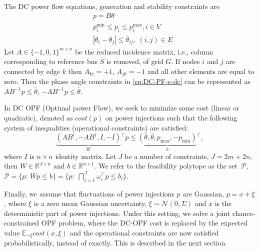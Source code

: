 The DC power flow equations, generation and stability constraints are
\begin{align}
    & p = B \theta \label{eq:DC-PF-a-dc}\\
    & p^{\min}_i \leq p_i \leq p^{\max}_i, i \in V \label{eq:DC-PF-b-dc}\\
    & |\theta_i - \theta_j| \leq \bar{\theta}_{ij}, \; (i,j)\in E \label{eq:DC-PF-c-dc}
\end{align}
Let $A \in \{-1,0,1 \}^{m \times n}$ be the reduced incidence matrix, i.e., column corresponding to reference bus $S$ is removed, of grid $G$. If nodes $i$ and $j$ are connected by edge $k$ then $A_{ki} = +1$, $A_{jk} = -1$ and all other elements are equal to zero. Then the phase angle constraints in \eqref{eq:DC-PF-c-dc} can be represented as  $AB^{-1}p \le \bar\theta$, $-AB^{-1}p \le \bar\theta$. 

In DC OPF (Optimal power Flow), we seek to minimize some cost (linear or quadratic), denoted as $\textit{cost}(p)$ on power injections such that the following system of inequalities (operational constraints) are satisfied: 
\[
\underbrace{(AB^\dagger, - A B^\dagger, I, -I)}_{W}\!\!{}^\top p \le \underbrace{(\bar\theta, \bar\theta, p_{\max}, -p_{\min})}_b\!\!{}^\top,
\]
where $I$ is $n\times n$ identity matrix. Let $J$ be a number of constraints, $J = 2m + 2n$, then $W\in\mathbb{R}^{J\times n}$ and $b\in\mathbb{R}^{n\times 1}$. We refer to the feasibility polytope as the set~$\mathcal{P}$, 
$\mathcal{P} = \bigl\{p:\, Wp \le b\bigr\} = \bigl\{p:\; \bigcap_{i=1}^J\omega_i^\top p \le b_i\bigr\}$.

Finally, we assume that fluctuations of power injections $p$ are Gaussian, $p = x +\xi$, where $\xi$ is a zero mean Gaussian uncertainty, $\xi\sim\mathcal{N}(0, \Sigma)$ and $x$ is the deterministic part of power injections. Under this setting, we solve a joint chance-constrained OPF problem, where the DC-OPF cost is replaced by the expected value $\mathbb{E}_{\sim \xi}\textit{cost}(x,\xi)$ and the operational constraints are now satisfied probabilistically, instead of exactly. This is described in the next section.

